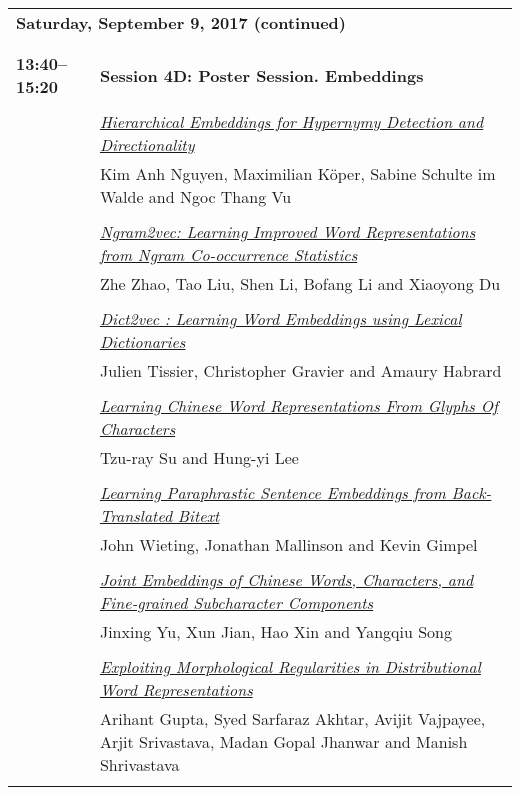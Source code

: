 \newpage
\begin{tabular}{p{20mm}p{128mm}}
\\
\multicolumn{2}{l}{\bf Saturday, September 9, 2017 (continued)} \\\\
\\{\bf 13:40--15:20} & {\bf Session 4D: Poster Session. Embeddings } \\
\\
 & \hyperlink{page.233}{\em Hierarchical Embeddings for Hypernymy Detection and Directionality}\\
         & Kim Anh Nguyen, Maximilian K\"{o}per, Sabine Schulte im Walde and Ngoc Thang Vu \\
\\

 & \hyperlink{page.244}{\em Ngram2vec: Learning Improved Word Representations from Ngram Co-occurrence Statistics}\\
         & Zhe Zhao, Tao Liu, Shen Li, Bofang Li and Xiaoyong Du \\
\\

 & \hyperlink{page.254}{\em Dict2vec : Learning Word Embeddings using Lexical Dictionaries}\\
         & Julien Tissier, Christopher Gravier and Amaury Habrard \\
\\

 & \hyperlink{page.264}{\em Learning Chinese Word Representations From Glyphs Of Characters}\\
         & Tzu-ray Su and Hung-yi Lee \\
\\

 & \hyperlink{page.274}{\em Learning Paraphrastic Sentence Embeddings from Back-Translated Bitext}\\
         & John Wieting, Jonathan Mallinson and Kevin Gimpel \\
\\

 & \hyperlink{page.286}{\em Joint Embeddings of Chinese Words, Characters, and Fine-grained Subcharacter Components}\\
         & Jinxing Yu, Xun Jian, Hao Xin and Yangqiu Song \\
\\

 & \hyperlink{page.292}{\em Exploiting Morphological Regularities in Distributional Word Representations}\\
         & Arihant Gupta, Syed Sarfaraz Akhtar, Avijit Vajpayee, Arjit Srivastava, Madan Gopal Jhanwar and Manish Shrivastava \\
\\


\end{tabular}
